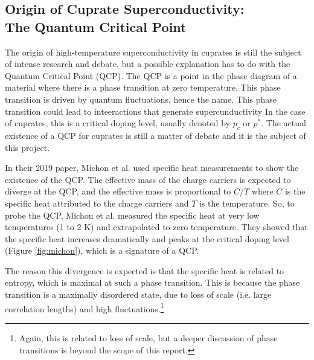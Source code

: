 \subsection{Origin of Cuprate Superconductivity:\\The Quantum Critical Point}
The origin of high-temperature superconductivity in cuprates is still the subject of intense
research and debate, but a possible explanation has to do with the Quantum Critical Point (QCP).
The QCP is a point in the phase diagram of a material where there is a phase transition at zero
temperature. This phase transition is driven by quantum fluctuations, hence the name. This phase
transition could lead to inteeractions that generate supercunductivity In the case of
cuprates, this is a critical doping level, usually denoted by $p_c$ or $p^*$. The actual existence
of a QCP for cuprates is still a matter of debate and it is the subject of this project.

In their 2019 paper, Michon et al.\cite{michon2019} used specific heat measurements to
show the existence of the QCP. The effective mass of the charge carriers is expected to diverge at
the QCP, and the effective mass is proportional to $C/T$ where $C$ is the specific heat attributed
to the charge carriers and $T$ is the temperature. So, to probe the QCP, Michon et al. measured
the specific heat at very low temperatures (1 to 2 K) and extrapolated to zero temperature. They
showed that the specific heat increases dramatically and peaks at the critical doping level
(Figure \ref{fig:michon}), which is a signature of a QCP.

The reason this divergence is expected is that the specific heat is related
to entropy, which is maximal at such a phase transition. This is because the phase transition is a
maximally disordered state, due to loss of scale (i.e. large correlation lengths) and high
fluctuations.\footnote{Again, this is related to loss of scale, but a deeper discussion of phase
transitions is beyond the scope of this report.}